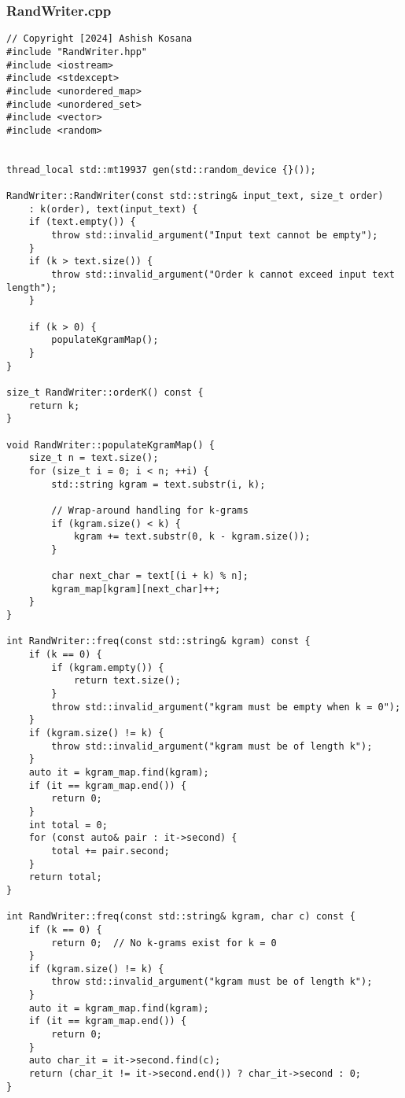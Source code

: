 \documentclass[12pt]{article}
\begin{document}
\subsubsection{RandWriter.cpp}
\begin{lstlisting}[style=cppcode]
// Copyright [2024] Ashish Kosana
#include "RandWriter.hpp"
#include <iostream>
#include <stdexcept>
#include <unordered_map>
#include <unordered_set>
#include <vector>
#include <random>


thread_local std::mt19937 gen(std::random_device {}());

RandWriter::RandWriter(const std::string& input_text, size_t order)
    : k(order), text(input_text) {
    if (text.empty()) {
        throw std::invalid_argument("Input text cannot be empty");
    }
    if (k > text.size()) {
        throw std::invalid_argument("Order k cannot exceed input text length");
    }

    if (k > 0) {
        populateKgramMap();
    }
}

size_t RandWriter::orderK() const {
    return k;
}

void RandWriter::populateKgramMap() {
    size_t n = text.size();
    for (size_t i = 0; i < n; ++i) {
        std::string kgram = text.substr(i, k);

        // Wrap-around handling for k-grams
        if (kgram.size() < k) {
            kgram += text.substr(0, k - kgram.size());
        }

        char next_char = text[(i + k) % n];
        kgram_map[kgram][next_char]++;
    }
}

int RandWriter::freq(const std::string& kgram) const {
    if (k == 0) {
        if (kgram.empty()) {
            return text.size();
        }
        throw std::invalid_argument("kgram must be empty when k = 0");
    }
    if (kgram.size() != k) {
        throw std::invalid_argument("kgram must be of length k");
    }
    auto it = kgram_map.find(kgram);
    if (it == kgram_map.end()) {
        return 0;
    }
    int total = 0;
    for (const auto& pair : it->second) {
        total += pair.second;
    }
    return total;
}

int RandWriter::freq(const std::string& kgram, char c) const {
    if (k == 0) {
        return 0;  // No k-grams exist for k = 0
    }
    if (kgram.size() != k) {
        throw std::invalid_argument("kgram must be of length k");
    }
    auto it = kgram_map.find(kgram);
    if (it == kgram_map.end()) {
        return 0;
    }
    auto char_it = it->second.find(c);
    return (char_it != it->second.end()) ? char_it->second : 0;
}


\end{lstlisting}
\end{document}
